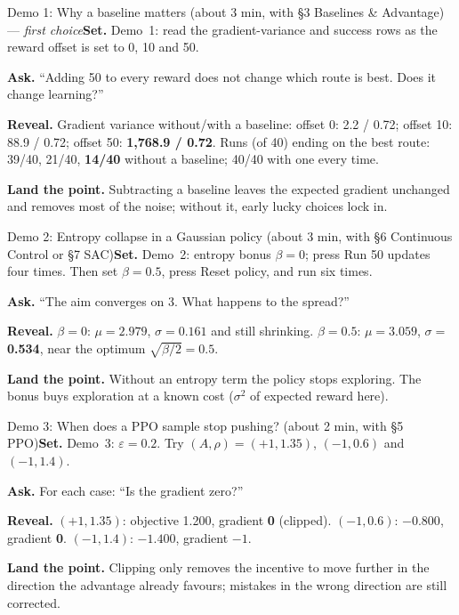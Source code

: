 \documentclass[11pt]{article}
\begin{document}
\begin{live}{Demo 1: Why a baseline matters (about 3 min, with \S3 Baselines \& Advantage) --- \emph{first choice}}\textbf{Set.} Demo~1: read the gradient-variance and success rows as the reward offset is set to 0, 10 and 50.\par\smallskip\textbf{Ask.} ``Adding 50 to every reward does not change which route is best. Does it change learning?''\par\smallskip\textbf{Reveal.} Gradient variance without/with a baseline: offset 0: 2.2 / 0.72; offset 10: 88.9 / 0.72; offset 50: \textbf{1,768.9 / 0.72}. Runs (of 40) ending on the best route: 39/40, 21/40, \textbf{14/40} without a baseline; 40/40 with one every time.\par\smallskip\textbf{Land the point.} Subtracting a baseline leaves the expected gradient unchanged and removes most of the noise; without it, early lucky choices lock in.\end{live}

\begin{live}{Demo 2: Entropy collapse in a Gaussian policy (about 3 min, with \S6 Continuous Control or \S7 SAC)}\textbf{Set.} Demo~2: entropy bonus $\beta=0$; press \textsf{Run 50 updates} four times. Then set $\beta=0.5$, press \textsf{Reset policy}, and run six times.\par\smallskip\textbf{Ask.} ``The aim converges on 3. What happens to the spread?''\par\smallskip\textbf{Reveal.} $\beta=0$: $\mu=2.979$, $\sigma=0.161$ and still shrinking. $\beta=0.5$: $\mu=3.059$, $\sigma=$ \textbf{0.534}, near the optimum $\sqrt{\beta/2}=0.5$.\par\smallskip\textbf{Land the point.} Without an entropy term the policy stops exploring. The bonus buys exploration at a known cost ($\sigma^2$ of expected reward here).\end{live}

\begin{live}{Demo 3: When does a PPO sample stop pushing? (about 2 min, with \S5 PPO)}\textbf{Set.} Demo~3: $\varepsilon=0.2$. Try $(A,\rho)=(+1,1.35)$, $(-1,0.6)$ and $(-1,1.4)$.\par\smallskip\textbf{Ask.} For each case: ``Is the gradient zero?''\par\smallskip\textbf{Reveal.} $(+1,1.35)$: objective 1.200, gradient \textbf{0} (clipped). $(-1,0.6)$: $-0.800$, gradient \textbf{0}. $(-1,1.4)$: $-1.400$, gradient \textbf{$-1$}.\par\smallskip\textbf{Land the point.} Clipping only removes the incentive to move further in the direction the advantage already favours; mistakes in the wrong direction are still corrected.\end{live}
\end{document}
